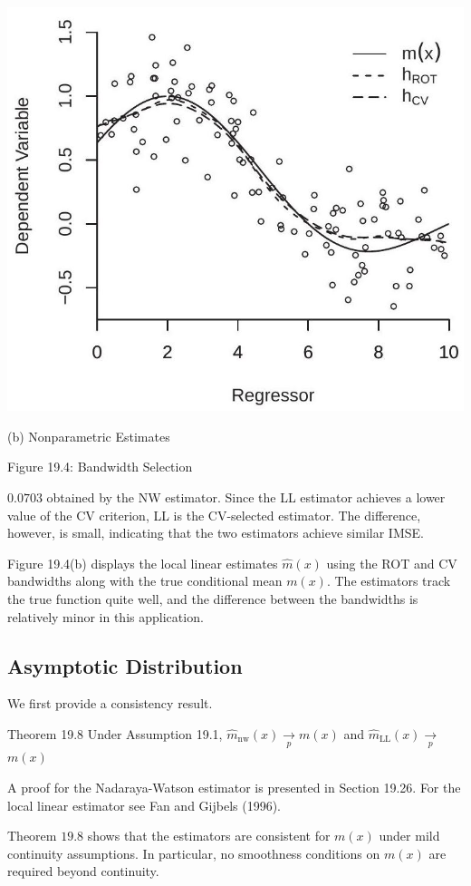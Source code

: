 \documentclass[10pt]{article}
\begin{document}
\includegraphics[max width=\textwidth]{2022_10_23_027876b875523fa3ea56g-17(1)}

(b) Nonparametric Estimates

Figure 19.4: Bandwidth Selection

$0.0703$ obtained by the NW estimator. Since the LL estimator achieves a lower value of the CV criterion, LL is the CV-selected estimator. The difference, however, is small, indicating that the two estimators achieve similar IMSE.

Figure 19.4(b) displays the local linear estimates $\widehat{m}(x)$ using the ROT and CV bandwidths along with the true conditional mean $m(x)$. The estimators track the true function quite well, and the difference between the bandwidths is relatively minor in this application.

\subsection{Asymptotic Distribution}
We first provide a consistency result.

Theorem 19.8 Under Assumption 19.1, $\hat{m}_{\mathrm{nw}}(x) \underset{p}{\rightarrow} m(x)$ and $\hat{m}_{\mathrm{LL}}(x) \underset{p}{\longrightarrow}$ $m(x)$

A proof for the Nadaraya-Watson estimator is presented in Section 19.26. For the local linear estimator see Fan and Gijbels (1996).

Theorem $19.8$ shows that the estimators are consistent for $m(x)$ under mild continuity assumptions. In particular, no smoothness conditions on $m(x)$ are required beyond continuity.
\end{document}
